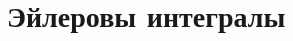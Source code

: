 \documentclass[../main.tex]{subfiles}
\begin{document}
 \chapter{Эйлеровы интегралы}
 
\end{document}
